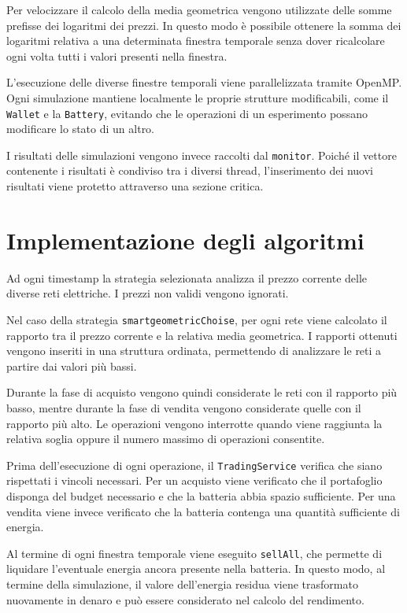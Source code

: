 \documentclass[12pt,a4paper,oneside]{report}
\begin{document}
Per velocizzare il calcolo della media geometrica vengono utilizzate delle
somme prefisse dei logaritmi dei prezzi. In questo modo è possibile ottenere
la somma dei logaritmi relativa a una determinata finestra temporale senza
dover ricalcolare ogni volta tutti i valori presenti nella finestra.

L'esecuzione delle diverse finestre temporali viene parallelizzata tramite
OpenMP. Ogni simulazione mantiene localmente le proprie strutture modificabili,
come il \texttt{Wallet} e la \texttt{Battery}, evitando che le operazioni di
un esperimento possano modificare lo stato di un altro.

I risultati delle simulazioni vengono invece raccolti dal \texttt{monitor}.
Poiché il vettore contenente i risultati è condiviso tra i diversi thread,
l'inserimento dei nuovi risultati viene protetto attraverso una sezione
critica.

\section{Implementazione degli algoritmi}

Ad ogni timestamp la strategia selezionata analizza il prezzo corrente delle
diverse reti elettriche. I prezzi non validi vengono ignorati.

Nel caso della strategia \texttt{smartgeometricChoise}, per ogni rete viene
calcolato il rapporto tra il prezzo corrente e la relativa media geometrica.
I rapporti ottenuti vengono inseriti in una struttura ordinata, permettendo
di analizzare le reti a partire dai valori più bassi.

Durante la fase di acquisto vengono quindi considerate le reti con il
rapporto più basso, mentre durante la fase di vendita vengono considerate
quelle con il rapporto più alto. Le operazioni vengono interrotte quando
viene raggiunta la relativa soglia oppure il numero massimo di operazioni
consentite.

Prima dell'esecuzione di ogni operazione, il \texttt{TradingService} verifica
che siano rispettati i vincoli necessari. Per un acquisto viene verificato
che il portafoglio disponga del budget necessario e che la batteria abbia
spazio sufficiente. Per una vendita viene invece verificato che la batteria
contenga una quantità sufficiente di energia.

Al termine di ogni finestra temporale viene eseguito \texttt{sellAll}, che
permette di liquidare l'eventuale energia ancora presente nella batteria.
In questo modo, al termine della simulazione, il valore dell'energia residua
viene trasformato nuovamente in denaro e può essere considerato nel calcolo
del rendimento.
\end{document}
